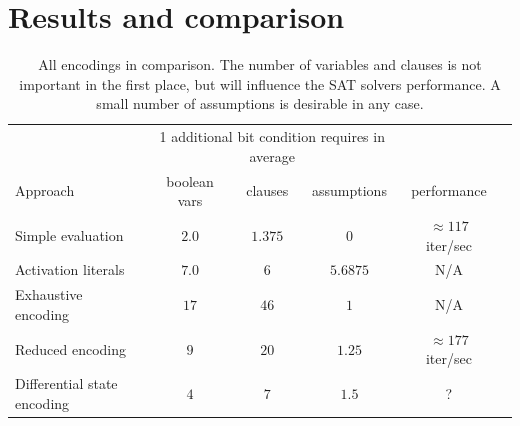 \section{Results and comparison}
%
%
\begin{table}
 \begin{center}
  \begin{tabular}{lccccc}
                               & \multicolumn{3}{c}{1 additional bit condition requires in average} & \\
   Approach                    & boolean vars & clauses & assumptions   & performance \\
  \hline
   Simple evaluation           & $2.0$        & $1.375$ & $0$           & $\approx117$ iter/sec \\  %
   Activation literals         & $7.0$        & $6$     & $5.6875$      & N/A \\
   Exhaustive encoding         & $17$         & $46$    & $1$           & N/A \\
   Reduced encoding            & $9$          & $20$    & $1.25$        & $\approx177$ iter/sec \\
   Differential state encoding & $4$          & $7$     & $1.5$         & ? \\
  \end{tabular}
  \caption[All encodings in comparison]{
    All encodings in comparison.
    The number of variables and clauses is not important in the first place, but will influence the SAT solvers performance.
    A small number of assumptions is desirable in any case.
  }
  \label{tab:encoding-cmp}
 \end{center}
\end{table}

